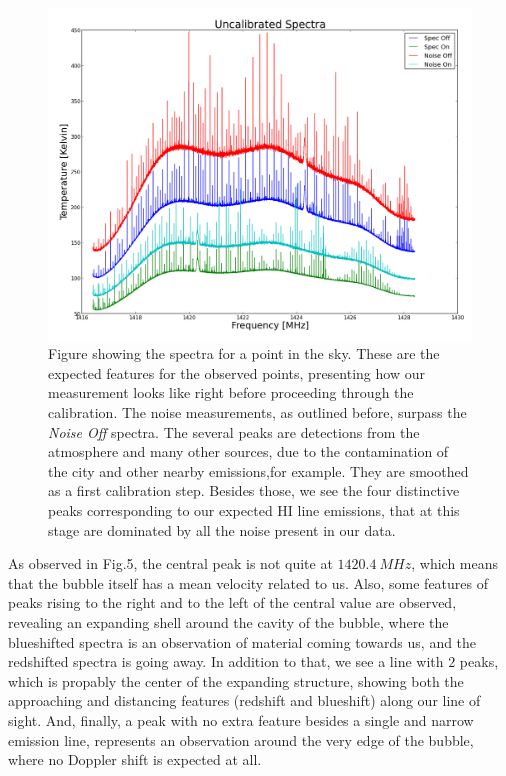 \documentclass{article}
\begin{document}
\begin{figure}[H]
\center
\includegraphics[scale=0.42]{uncal.png}
\caption {Figure showing the spectra for a point in the sky. These are the expected 
features for the observed points, presenting how our measurement looks like right
before proceeding through the calibration. The noise measurements, as outlined before, surpass
the \emph{Noise Off} spectra. The several peaks are detections from the
atmosphere and many other sources, due to the contamination of the city and other nearby emissions,for example. They are smoothed as a first calibration step.
Besides those, we see the four distinctive peaks corresponding to our
expected HI line emissions, that at this stage are dominated by all the noise present 
in our data.} 
\label{moon_win}
\end{figure}


As observed in Fig.5, the central peak is not quite at $1420.4 \ MHz$, which means that the bubble itself has a mean velocity related to us. Also, some features of peaks rising to the right and to the left of the central value are observed, revealing an expanding shell around the cavity of the
bubble, where the blueshifted spectra is an observation of material coming towards us, and 
the redshifted spectra is going away. In addition to that, we see a line with $2$ peaks,
which is propably the center of the expanding structure, showing both the approaching and
distancing features (redshift and blueshift) along our line of sight. And, finally,
a peak with no extra feature besides a single and narrow emission line, represents an
observation around the very edge of the bubble, where no Doppler shift is expected at all. 
 
\end{document}
